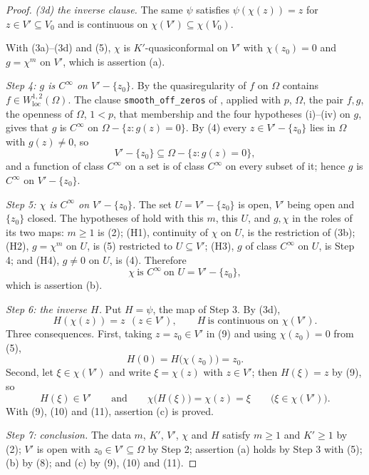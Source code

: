 \begin{proof}
\emph{(3d) the inverse clause.}  The same $\psi$ satisfies $\psi(\chi(z))=z$
for $z\in V'\subseteq V_0$ and is continuous on
$\chi(V')\subseteq\chi(V_0)$.

With (3a)--(3d) and (5), $\chi$ is $K'$-quasiconformal on $V'$ with
$\chi(z_0)=0$ and $g=\chi^{m}$ on $V'$, which is assertion (a).

\emph{Step 4: $g$ is $C^\infty$ on $V'-\{z_0\}$.}  By 
the quasiregularity of $f$ on $\Omega$ contains
$f\in W^{1,2}_{\mathrm{loc}}(\Omega)$.  The clause
\texttt{smooth\_off\_zeros} of , applied with $p$,
$\Omega$, the pair $f,g$, the openness of $\Omega$, $1<p$, that membership and
the four hypotheses (i)--(iv) on $g$, gives that $g$ is $C^\infty$ on
$\Omega-\{z:g(z)=0\}$.  By (4) every $z\in V'-\{z_0\}$ lies in $\Omega$ with
$g(z)\neq0$, so
\begin{equation}\tag{7}
  V'-\{z_0\}\subseteq\Omega-\{z:g(z)=0\},
\end{equation}
and a function of class $C^\infty$ on a set is of class $C^\infty$ on every
subset of it; hence $g$ is $C^\infty$ on $V'-\{z_0\}$.

\emph{Step 5: $\chi$ is $C^\infty$ on $V'-\{z_0\}$.}  The set $U=V'-\{z_0\}$
is open, $V'$ being open and $\{z_0\}$ closed.  The hypotheses of
 hold with this $m$, this $U$, and $g,\chi$ in the
roles of its two maps: $m\ge1$ is (2); (H1), continuity of $\chi$ on $U$, is
the restriction of (3b); (H2), $g=\chi^{m}$ on $U$, is (5) restricted to
$U\subseteq V'$; (H3), $g$ of class $C^\infty$ on $U$, is Step 4; and (H4),
$g\neq0$ on $U$, is (4).  Therefore
\begin{equation}\tag{8}
  \chi\ \text{is }C^\infty\ \text{on }U=V'-\{z_0\},
\end{equation}
which is assertion (b).

\emph{Step 6: the inverse $H$.}  Put $H=\psi$, the map of Step 3.  By (3d),
\begin{equation}\tag{9}
  H(\chi(z))=z\ \ (z\in V'),\qquad H\ \text{is continuous on }\chi(V') .
\end{equation}
Three consequences.  First, taking $z=z_0\in V'$ in (9) and using $\chi(z_0)=0$
from (5),
\begin{equation}\tag{10}
  H(0)=H\bigl(\chi(z_0)\bigr)=z_0 .
\end{equation}
Second, let $\xi\in\chi(V')$ and write $\xi=\chi(z)$ with $z\in V'$; then
$H(\xi)=z$ by (9), so
\begin{equation}\tag{11}
  H(\xi)\in V'\qquad\text{and}\qquad \chi\bigl(H(\xi)\bigr)=\chi(z)=\xi
  \qquad\bigl(\xi\in\chi(V')\bigr).
\end{equation}
With (9), (10) and (11), assertion (c) is proved.

\emph{Step 7: conclusion.}  The data $m$, $K'$, $V'$, $\chi$ and $H$ satisfy
$m\ge1$ and $K'\ge1$ by (2); $V'$ is open with $z_0\in V'\subseteq\Omega$ by
Step 2; assertion (a) holds by Step 3 with (5); (b) by (8); and (c) by (9),
(10) and (11).
\end{proof}
